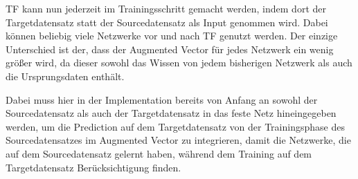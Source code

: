 TF kann nun jederzeit im Trainingsschritt gemacht werden, indem dort der Targetdatensatz statt der Sourcedatensatz als Input genommen 
wird. Dabei können beliebig viele Netzwerke vor und nach TF genutzt werden. Der einzige Unterschied ist der, dass der Augmented Vector 
für jedes Netzwerk ein wenig größer wird, da dieser sowohl das Wissen von jedem bisherigen Netzwerk als auch die Ursprungsdaten enthält. 

Dabei muss hier in der Implementation bereits von Anfang an sowohl der Sourcedatensatz als auch der Targetdatensatz in das feste Netz 
hineingegeben werden, um die Prediction auf dem Targetdatensatz von der Trainingsphase des Sourcedatensatzes im Augmented Vector zu 
integrieren, damit die Netzwerke, die auf dem Sourcedatensatz gelernt haben, während dem Training auf dem Targetdatensatz Berücksichtigung finden. 
